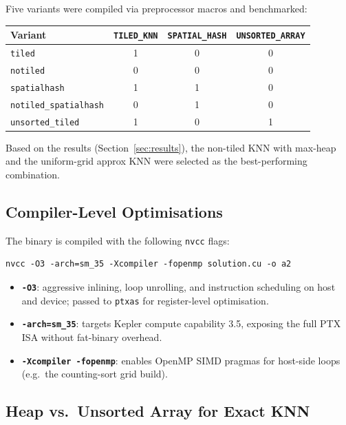 \documentclass[11pt,a4paper]{article}
\begin{document}
Five variants were compiled via preprocessor macros and benchmarked:

\begin{center}
\begin{tabular}{lccc}
\toprule
Variant & \texttt{TILED\_KNN} & \texttt{SPATIAL\_HASH} & \texttt{UNSORTED\_ARRAY} \\
\midrule
\texttt{tiled}                   & 1 & 0 & 0 \\
\texttt{notiled}                 & 0 & 0 & 0 \\
\texttt{spatialhash}             & 1 & 1 & 0 \\
\texttt{notiled\_spatialhash}    & 0 & 1 & 0 \\
\texttt{unsorted\_tiled}         & 1 & 0 & 1 \\
\bottomrule
\end{tabular}
\end{center}

Based on the results (Section~\ref{sec:results}), the non-tiled KNN with
max-heap and the uniform-grid approx KNN were selected as the best-performing
combination.  

\subsection{Compiler-Level Optimisations}
The binary is compiled with the following \texttt{nvcc} flags:
\begin{lstlisting}
nvcc -O3 -arch=sm_35 -Xcompiler -fopenmp solution.cu -o a2
\end{lstlisting}

\begin{itemize}
  \item \textbf{\texttt{-O3}}: aggressive inlining, loop unrolling, and instruction scheduling on host and device; passed to \texttt{ptxas} for register-level optimisation.
  \item \textbf{\texttt{-arch=sm\_35}}: targets Kepler compute capability 3.5, exposing the full PTX ISA without fat-binary overhead.
  \item \textbf{\texttt{-Xcompiler -fopenmp}}: enables OpenMP SIMD pragmas for host-side loops (e.g.\ the counting-sort grid build).
\end{itemize}

\subsection{Heap vs.\ Unsorted Array for Exact KNN}
\end{document}
